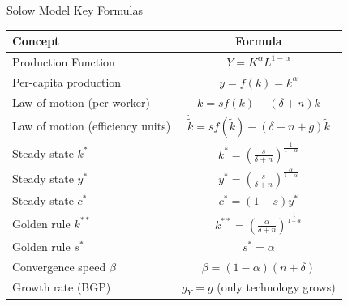 \begin{frame}{Solow Model Key Formulas}
\begin{table}
\centering
\begin{tabular}{|l|c|}
\hline
\textbf{Concept} & \textbf{Formula} \\
\hline
Production Function & $Y = K^\alpha L^{1-\alpha}$ \\
\hline
Per-capita production & $y = f(k) = k^\alpha$ \\
\hline
Law of motion (per worker) & $\dot{k} = sf(k) - (\delta + n)k$ \\
\hline
Law of motion (efficiency units) & $\dot{\tilde{k}} = sf(\tilde{k}) - (\delta + n + g)\tilde{k}$ \\
\hline
Steady state $k^*$ & $k^* = \left(\frac{s}{\delta + n}\right)^{\frac{1}{1-\alpha}}$ \\
\hline
Steady state $y^*$ & $y^* = \left(\frac{s}{\delta + n}\right)^{\frac{\alpha}{1-\alpha}}$ \\
\hline
Steady state $c^*$ & $c^* = (1-s)y^*$ \\
\hline
Golden rule $k^{**}$ & $k^{**} = \left(\frac{\alpha}{\delta + n}\right)^{\frac{1}{1-\alpha}}$ \\
\hline
Golden rule $s^*$ & $s^* = \alpha$ \\
\hline
Convergence speed $\beta$ & $\beta = (1-\alpha)(n + \delta)$ \\
\hline
Growth rate (BGP) & $g_Y = g$ (only technology grows) \\
\hline
\end{tabular}
\end{table}
\end{frame}


